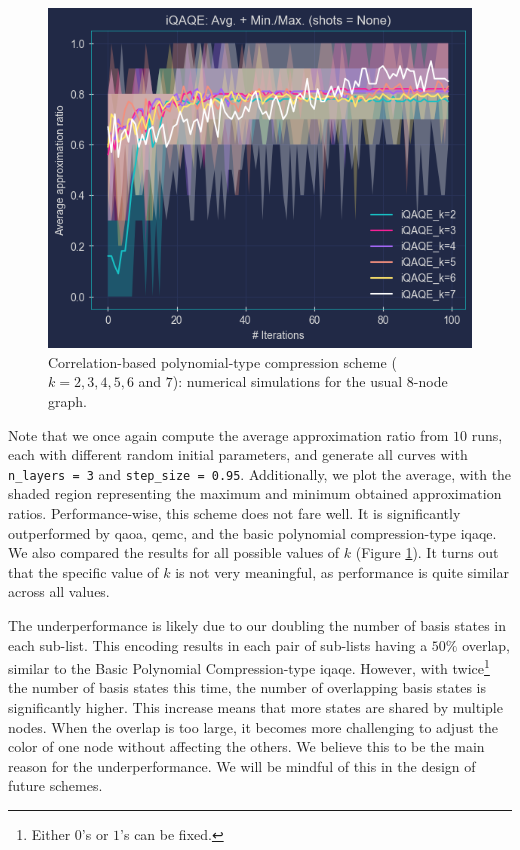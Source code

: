 \clearpage

\footnotetext[\value{footnote}]{This refers to the scenario where only $1$'s are fixed, not $0$'s.}

\begin{figure}[H]
  \centering
  \includegraphics[width=\textwidth]{Figures/Chapter_5/Correlation-based/All_k's.png}
  \caption{Correlation-based polynomial-type compression scheme ($k = 2, 3, 4, 5, 6$ and $7$): numerical simulations for the usual $8$-node graph.}
  \label{fig:All_k's}
\end{figure}

Note that we once again compute the average approximation ratio from $10$ runs, each with different random initial parameters, and generate all curves with \texttt{n\_layers = 3} and \texttt{step\_size = 0.95}. Additionally, we plot the average, with the shaded region representing the maximum and minimum obtained approximation ratios. Performance-wise, this scheme does not fare well. It is significantly outperformed by \acrshort{qaoa}, \acrshort{qemc}, and the basic polynomial compression-type \acrshort{iqaqe}. We also compared the results for all possible values of $k$ (Figure \ref{fig:All_k's}). It turns out that the specific value of $k$ is not very meaningful, as performance is quite similar across all values.

The underperformance is likely due to our doubling the number of basis states in each sub-list. This encoding results in each pair of sub-lists having a $50\%$ overlap, similar to the Basic Polynomial Compression-type \acrshort{iqaqe}. However, with twice\footnote{Either $0$'s or $1$'s can be fixed.} the number of basis states this time, the number of overlapping basis states is significantly higher. This increase means that more states are shared by multiple nodes. When the overlap is too large, it becomes more challenging to adjust the color of one node without affecting the others. We believe this to be the main reason for the underperformance. We will be mindful of this in the design of future schemes.

